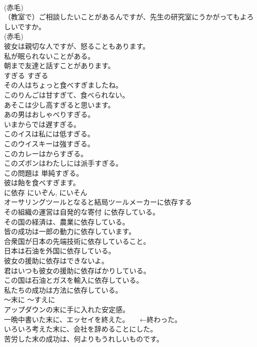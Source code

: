 \documentclass[8pt]{extreport}
\begin{document}
\begin{CJK}{UTF8}{min}
\\	(赤毛)
\\	（教室で）ご相談したいことがあるんですが、先生の研究室にうかがってもよろしいですか。  
\\	(赤毛)
\\	彼女は親切な人ですが、怒ることもあります。  
\\	私が眠られないことがある。  
\\	朝まで友達と話すことがあります。  
\\	すぎる	すぎる	
\\	その人はちょっと食べすぎましたね。   
\\	このりんごは甘すぎて、食べられない。  
\\	あそこは少し高すぎると思います。  
\\	あの男はおしゃべりすぎる。  
\\	いまからでは遅すぎる。  
\\	このイスは私には低すぎる。  
\\	このウイスキーは強すぎる。  
\\	このカレーはからすぎる。  
\\	このズボンはわたしには派手すぎる。  
\\	この問題は 単純すぎる。  
\\	彼は飴を食べすぎます。   
\\	に依存	にいぞん, にいそん	
\\	オーサリングツールとなると結局ツールメーカーに依存する  
\\	その組織の運営は自発的な寄付 に依存している。  
\\	その国の経済は、農業に依存している。  
\\	皆の成功は一郎の動力に依存しています。  
\\	合衆国が日本の先端技術に依存していること。   
\\	日本は石油を外国に依存している。   
\\	彼女の援助に依存はできないよ。   
\\	君はいつも彼女の援助に依存ばかりしている。   
\\	この国は石油とガスを輸入に依存している。   
\\	私たちの成功は方法に依存している。   
\\	〜末に	〜すえに	
\\	アップダウンの末に手に入れた安定感。  
\\	一晩中書いた末に、エッセイを終えた。　　←終わった。  
\\	いろいろ考えた末に、会社を辞めることにした。  
\\	苦労した末の成功は、何よりもうれしいものです。  

\end{CJK}
\end{document}
